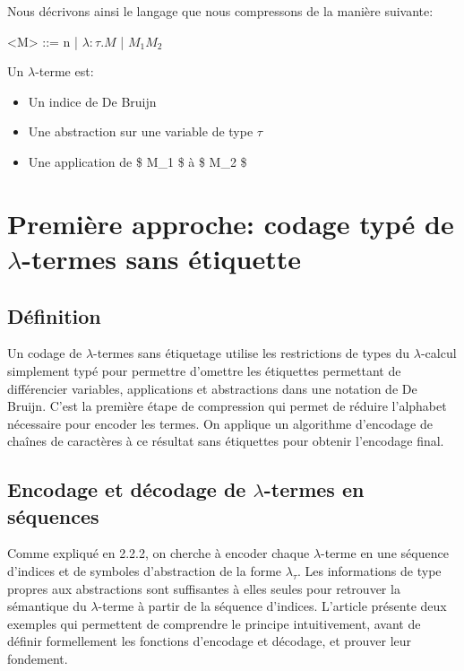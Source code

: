 \documentclass[titlepage]{article}
\providecommand{\tightlist}{%
  \setlength{\itemsep}{0pt}\setlength{\parskip}{0pt}}
\begin{document}
Nous décrivons ainsi le langage que nous compressons de la manière
suivante:

\begin{grammar}

\let\syntleft\relax
\let\syntright\relax

<M> ::= n
\alt    | $\lambda: \tau.M$
\alt    | $M_1 M_2$
\end{grammar}

Un \(\lambda\)-terme est:

\begin{itemize}
\tightlist
\item
  Un indice de De Bruijn
\item
  Une abstraction sur une variable de type \(\tau\)
\item
  Une application de \$ M\_1 \$ à \$ M\_2 \$
\end{itemize}

\section{Première approche: codage typé de $\lambda$-termes sans étiquette}\label{premiuxe8re-approche-codage-sans-uxe9tiquette-de-lambda-termes-basuxe9-sur-les-types}

\subsection{Définition}\label{duxe9finition}

Un codage de \(\lambda\)-termes sans étiquetage utilise les restrictions
de types du \(\lambda\)-calcul simplement typé pour permettre d'omettre
les étiquettes permettant de différencier variables, applications et
abstractions dans une notation de De Bruijn. C'est la première étape de
compression qui permet de réduire l'alphabet nécessaire pour encoder les
termes. On applique un algorithme d'encodage de chaînes de caractères à
ce résultat sans étiquettes pour obtenir l'encodage final.

\subsection{\texorpdfstring{Encodage et décodage de \(\lambda\)-termes
en
séquences}{Encodage et décodage de \(\lambda\)-termes en séquences}}\label{encodage-et-duxe9codage-de-lambda-termes-en-suxe9quences}

Comme expliqué en 2.2.2, on cherche à encoder chaque \(\lambda\)-terme
en une séquence d'indices et de symboles d'abstraction de la forme
\(\lambda_\tau\). Les informations de type propres aux abstractions sont
suffisantes à elles seules pour retrouver la sémantique du
\(\lambda\)-terme à partir de la séquence d'indices. L'article présente
deux exemples qui permettent de comprendre le principe intuitivement,
avant de définir formellement les fonctions d'encodage et décodage, et
prouver leur fondement.
\end{document}
